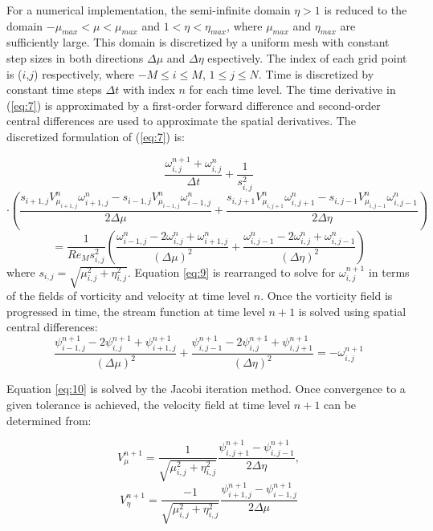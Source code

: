 \documentclass{article}
\begin{document}
For a numerical implementation, the semi-infinite domain $\eta > 1$ is reduced to the domain $-\mu_{max} < \mu < \mu_{max}$ and $1 < \eta < \eta_{max}$, where $\mu_{max}$ and $\eta_{max}$ are sufficiently large. This domain is discretized by a uniform mesh with constant step sizes in both directions $\Delta \mu$ and $\Delta \eta$ espectively. The index of each grid point is ($i$,$j$) respectively, where $-M \le i \le M$, $1 \le j \le N$. Time is discretized by constant time steps $\Delta t$ with index $n$ for each time level. The time
derivative in (\ref{eq:7}) is approximated by a first-order forward difference and second-order central
differences are used to approximate the spatial derivatives. The discretized formulation of (\ref{eq:7}) is:

\[
\frac{\omega^{n+1}_{i,j}+\omega^n_{i,j}}{\Delta t} + \frac{1}{s^2_{i,j}}
\]
\[
\cdot \left(
\frac{s_{i+1,j}V^n_{\mu_{i+1,j}}\omega^n_{i+1,j}-s_{i-1,j}V^n_{\mu_{i-1,j}}\omega^n_{i-1,j}}
     {2\Delta\mu}
+
\frac{s_{i,j+1}V^n_{\mu_{i,j+1}}\omega^n_{i,j+1}-s_{i,j-1}V^n_{\mu_{i,j-1}}\omega^n_{i,j-1}}
     {2\Delta\eta}
\right)
\]
\begin{equation}
\label{eq:9}
=\frac{1}{Re_M s^2_{i,j}}
\left(
\frac{\omega^n_{i-1,j}-2\omega^n_{i,j}+\omega^n_{i+1,j}}{(\Delta\mu)^2}
+
\frac{\omega^n_{i,j-1}-2\omega^n_{i,j}+\omega^n_{i,j-1}}{(\Delta\eta)^2}
\right)
\end{equation}
where $s_{i,j}=\sqrt{\mu^2_{i,j}+\eta^2_{i,j}}$.
Equation \ref{eq:9} is rearranged to solve for $\omega^{n+1}_{i,j}$ in terms of the fields of
vorticity and velocity at time level $n$.
Once the vorticity field is progressed in time, the stream
function at time level $n+1$ is solved using spatial central differences:
\begin{equation}
\label{eq:10}
\frac{\psi^{n+1}_{i-1,j}-2\psi^{n+1}_{i,j}+\psi^{n+1}_{i+1,j}}{(\Delta\mu)^2}+
\frac{\psi^{n+1}_{i,j-1}-2\psi^{n+1}_{i,j}+\psi^{n+1}_{i,j+1}}{(\Delta\eta)^2}
=-\omega^{n+1}_{i,j}
\end{equation}

Equation \ref{eq:10} is solved by the Jacobi iteration method. Once convergence to a given tolerance is achieved, the velocity field at time level $n+1$ can be determined from:

\[
V_\mu^{n+1}=\frac{1}{\sqrt{\mu_{i,j}^2+\eta_{i,j}^2}} \frac{\psi_{i,j+1}^{n+1} - \psi_{i,j-1}^{n+1}}{2\Delta \eta},
\]
\begin{equation}
\label{eq:11}
V_\eta^{n+1}=\frac{-1}{\sqrt{\mu_{i,j}^2+\eta_{i,j}^2}} \frac{\psi_{i+1,j}^{n+1} - \psi_{i-1,j}^{n+1}}{2\Delta \mu}
\end{equation}
\end{document}
